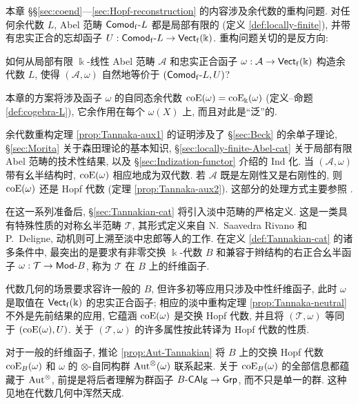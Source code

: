 本章 \S\S\ref{sec:coend}---\ref{sec:Hopf-reconstruction} 的内容涉及余代数的重构问题. 对任何余代数 $L$, Abel 范畴 $\mathsf{Comod}_{\mathrm{f}}\text{-}L$ 都是局部有限的 (定义 \ref{def:locally-finite}), 并带有忠实正合的忘却函子 $U: \mathsf{Comod}_{\mathrm{f}}\text{-}L \to \mathsf{Vect}_{\mathrm{f}}(\Bbbk)$. 重构问题关切的是反方向:
\begin{center}\begin{minipage}{0.8\textwidth}
	如何从局部有限 $\Bbbk$-线性 Abel 范畴 $\mathcal{A}$ 和忠实正合函子 $\omega: \mathcal{A} \to \mathsf{Vect}_{\mathrm{f}}(\Bbbk)$ 构造余代数 $L$, 使得 $(\mathcal{A}, \omega)$ 自然地等价于 $(\mathsf{Comod}_{\mathrm{f}}\text{-}L, U)$?
\end{minipage}\end{center}
本章的方案将涉及函子 $\omega$ 的自同态余代数 $\operatorname{coE}(\omega) = \operatorname{coE}_{\Bbbk}(\omega)$ (定义--命题 \ref{def:cogebra-L}), 它余作用在每个 $\omega(X)$ 上, 而且对此是``泛''的.

余代数重构定理 \ref{prop:Tannaka-aux1} 的证明涉及了 \S\ref{sec:Beck} 的余单子理论, \S\ref{sec:Morita} 关于森田理论的基本知识, \S\ref{sec:locally-finite-Abel-cat} 关于局部有限 Abel 范畴的技术性结果, 以及 \S\ref{sec:Indization-functor} 介绍的 Ind 化. 当 $(\mathcal{A}, \omega)$ 带有幺半结构时, $\operatorname{coE}(\omega)$ 相应地成为双代数. 若 $\mathcal{A}$ 既是左刚性又是右刚性的, 则 $\operatorname{coE}(\omega)$ 还是 Hopf 代数 (定理 \ref{prop:Tannaka-aux2}). 这部分的处理方式主要参照 \cite{Del90}.

在这一系列准备后, \S\ref{sec:Tannakian-cat} 将引入淡中范畴的严格定义. 这是一类具有特殊性质的对称幺半范畴 $\mathcal{T}$, 其形式定义来自 N.\ Saavedra Rivano 和 P.\ Deligne, 动机则可上溯至淡中忠郎等人的工作. 在定义 \ref{def:Tannakian-cat} 的诸多条件中, 最突出的是要求有非零交换 $\Bbbk$-代数 $B$ 和兼容于辫结构的右正合幺半函子 $\omega: \mathcal{T} \to \mathsf{Mod}\text{-}B$, 称为 $\mathcal{T}$ 在 $B$ 上的纤维函子.

代数几何的场景要求容许一般的 $B$, 但许多初等应用只涉及中性纤维函子, 此时 $\omega$ 是取值在 $\mathsf{Vect}_{\mathrm{f}}(\Bbbk)$ 的忠实正合函子; 相应的淡中重构定理 \ref{prop:Tannaka-neutral} 不外是先前结果的应用, 它蕴涵 $\operatorname{coE}(\omega)$ 是交换 Hopf 代数, 并且将 $(\mathcal{T}, \omega)$ 等同于 $(\operatorname{coE}(\omega), U)$. 关于 $(\mathcal{T}, \omega)$ 的许多属性按此转译为 Hopf 代数的性质.

对于一般的纤维函子, 推论 \ref{prop:Aut-Tannakian} 将 $B$ 上的交换 Hopf 代数 $\operatorname{coE}_B(\omega)$ 和 $\omega$ 的 $\otimes$-自同构群 $\operatorname{Aut}^{\otimes}(\omega)$ 联系起来. 关于 $\operatorname{coE}_B(\omega)$ 的全部信息都蕴藏于 $\operatorname{Aut}^{\otimes}$, 前提是将后者理解为群函子 $B\text{-}\mathsf{CAlg} \to \mathsf{Grp}$, 而不只是单一的群. 这种见地在代数几何中浑然天成.

